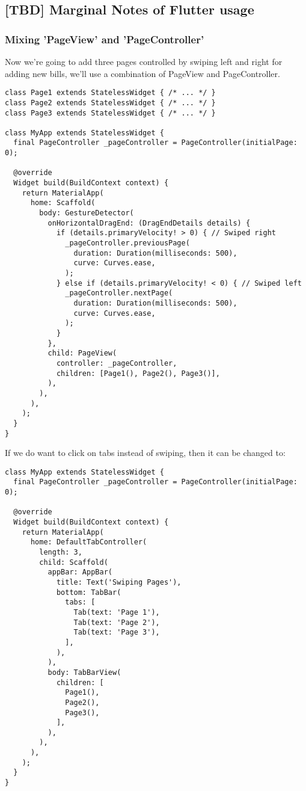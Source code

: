
\subsection{[TBD] Marginal Notes of Flutter usage}


\subsubsection{Mixing 'PageView' and 'PageController'}

Now we're going to add three pages controlled by swiping left and right for adding new bills, we'll use a combination 
of PageView and PageController. 

\begin{lstlisting}
class Page1 extends StatelessWidget { /* ... */ }
class Page2 extends StatelessWidget { /* ... */ }
class Page3 extends StatelessWidget { /* ... */ }

class MyApp extends StatelessWidget {
  final PageController _pageController = PageController(initialPage: 0);

  @override
  Widget build(BuildContext context) {
    return MaterialApp(
      home: Scaffold(
        body: GestureDetector(
          onHorizontalDragEnd: (DragEndDetails details) {
            if (details.primaryVelocity! > 0) { // Swiped right
              _pageController.previousPage(
                duration: Duration(milliseconds: 500),
                curve: Curves.ease,
              );
            } else if (details.primaryVelocity! < 0) { // Swiped left
              _pageController.nextPage(
                duration: Duration(milliseconds: 500),
                curve: Curves.ease,
              );
            }
          },
          child: PageView(
            controller: _pageController,
            children: [Page1(), Page2(), Page3()],
          ),
        ),
      ),
    );
  }
}
\end{lstlisting}

If we do want to click on tabs instead of swiping, then it can be changed to:

\begin{lstlisting}
class MyApp extends StatelessWidget {
  final PageController _pageController = PageController(initialPage: 0);

  @override
  Widget build(BuildContext context) {
    return MaterialApp(
      home: DefaultTabController(
        length: 3,
        child: Scaffold(
          appBar: AppBar(
            title: Text('Swiping Pages'),
            bottom: TabBar(
              tabs: [
                Tab(text: 'Page 1'),
                Tab(text: 'Page 2'),
                Tab(text: 'Page 3'),
              ],
            ),
          ),
          body: TabBarView(
            children: [
              Page1(),
              Page2(),
              Page3(),
            ],
          ),
        ),
      ),
    );
  }
}
\end{lstlisting}

